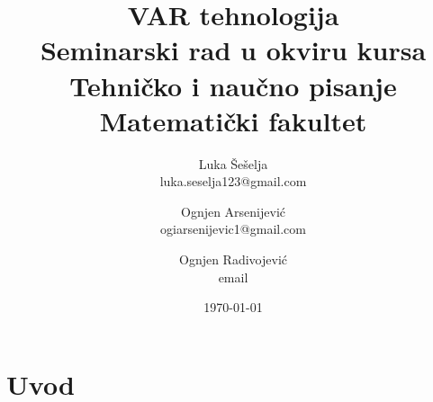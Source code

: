 \documentclass[a4paper]{article}
\begin{document}
\title{VAR tehnologija\\ \small{Seminarski rad u okviru kursa\\Tehničko i naučno pisanje\\ Matematički fakultet}}

\author{Luka Šešelja\\ luka.seselja123@gmail.com \and Ognjen Arsenijević\\ ogiarsenijevic1@gmail.com \and Ognjen Radivojević\\ email}
\date{\today}
\maketitle

\begin{abstract}
    
\end{abstract}

\tableofcontents

\newpage

\section{Uvod}
\label{sec:uvod}
\end{document}
